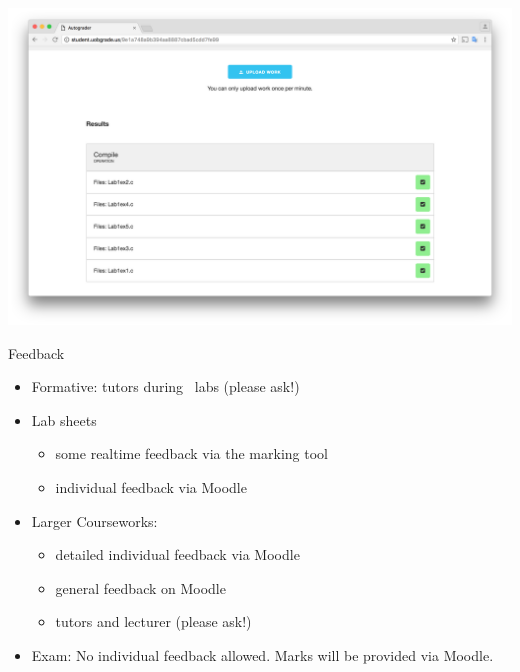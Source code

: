 \documentclass{beamer}
\begin{document}
\begin{frame}[fragile]
\includegraphics[scale=0.12]{Auto2.png}
\end{frame}

\begin{frame}
Feedback
\begin{itemize}
\item Formative: tutors during \ labs (please ask!)
\item Lab sheets

\begin{itemize}
\item some realtime feedback via the marking tool
\item individual feedback via Moodle
\end{itemize}
\item Larger Courseworks:

\begin{itemize}
\item detailed individual feedback via Moodle
\item general feedback on Moodle
\item tutors and lecturer (please ask!)
\end{itemize}
\item Exam: No individual feedback allowed. Marks will be provided via Moodle.
\end{itemize}
\end{frame} 
\end{document}
